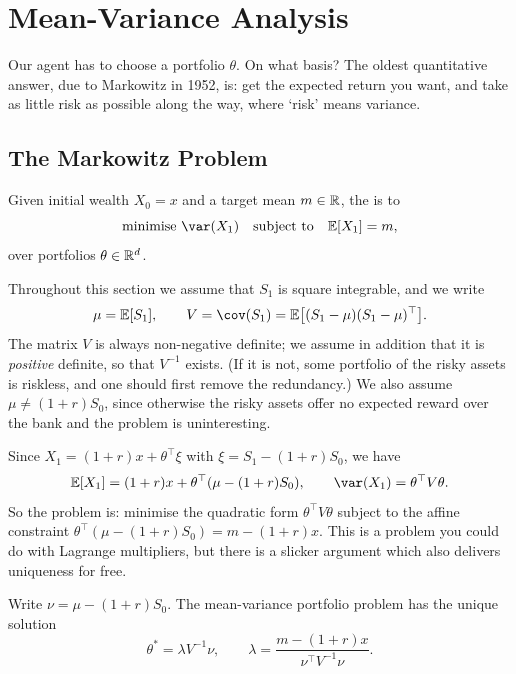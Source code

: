 \documentclass[a4paper]{scrartcl}
\begin{document}
\section{Mean-Variance Analysis}

Our agent has to choose a portfolio $\theta$. On what basis? The oldest quantitative answer, due to Markowitz in 1952, is: get the expected return you want, and take as little risk as possible along the way, where `risk' means variance.

\subsection{The Markowitz Problem}

\begin{definition}
	Given initial wealth $X_0 = x$ and a target mean $m \in \mathbb{R}$, the  is to
	$$
	\text{minimise } \var(X_1) \quad \text{subject to} \quad \EE[X_1] = m,
	$$
	over portfolios $\theta \in \mathbb{R}^d$.
\end{definition}

Throughout this section we assume that $S_1$ is square integrable, and we write
$$
\mu = \EE[S_1], \qquad V = \cov(S_1) = \EE\big[(S_1 - \mu)(S_1-\mu)^\top\big].
$$
The matrix $V$ is always non-negative definite; we assume in addition that it is \emph{positive} definite, so that $V^{-1}$ exists. (If it is not, some portfolio of the risky assets is riskless, and one should first remove the redundancy.) We also assume $\mu \neq (1+r)S_0$, since otherwise the risky assets offer no expected reward over the bank and the problem is uninteresting.

Since $X_1 = (1+r)x + \theta^\top \xi$ with $\xi = S_1 - (1+r)S_0$, we have
$$
\EE[X_1] = (1+r)x + \theta^\top(\mu - (1+r)S_0), \qquad \var(X_1) = \theta^\top V \theta.
$$
So the problem is: minimise the quadratic form $\theta^\top V\theta$ subject to the affine constraint $\theta^\top(\mu - (1+r)S_0) = m - (1+r)x$. This is a problem you could do with Lagrange multipliers, but there is a slicker argument which also delivers uniqueness for free.

\begin{theorem}[Markowitz]\label{thm:markowitz}
	Write $\nu = \mu - (1+r)S_0$. The mean-variance portfolio problem has the unique solution
	$$
	\theta^* = \lambda V^{-1}\nu, \qquad \lambda = \frac{m - (1+r)x}{\nu^\top V^{-1}\nu}.
	$$
\end{theorem}
\end{document}

